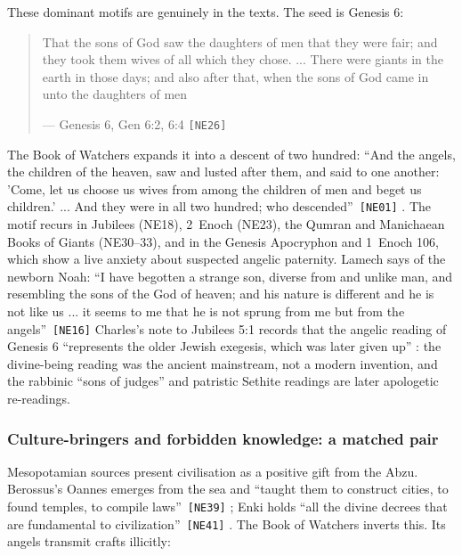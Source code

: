 \documentclass[11pt,a4paper]{article}
\newcommand{\pid}[1]{\texttt{\small #1}}
\begin{document}
These dominant motifs are genuinely in the texts. The seed is Genesis 6:

\begin{quote}\small That the sons of God saw the daughters of men that they were fair; and they took them wives of all which they chose. ... There were giants in the earth in those days; and also after that, when the sons of God came in unto the daughters of men\par\hfill{\footnotesize --- Genesis 6, Gen 6:2, 6:4 \pid{[NE26]}}\end{quote}

The Book of Watchers expands it into a descent of two hundred: \enquote{And the angels, the children of the heaven, saw and lusted after them, and said to one another: 'Come, let us choose us wives from among the children of men and beget us children.' ... And they were in all two hundred; who descended}~\pid{[NE01]} \parencite{charles1917enoch}. The motif recurs in Jubilees (NE18), 2~Enoch (NE23), the Qumran and Manichaean Books of Giants (NE30--33), and in the Genesis Apocryphon and 1~Enoch 106, which show a live anxiety about suspected angelic paternity. Lamech says of the newborn Noah: \enquote{I have begotten a strange son, diverse from and unlike man, and resembling the sons of the God of heaven; and his nature is different and he is not like us ... it seems to me that he is not sprung from me but from the angels}~\pid{[NE16]} Charles's note to Jubilees 5:1 records that the angelic reading of Genesis 6 ``represents the older Jewish exegesis, which was later given up'' \parencite{charles1917jubilees}: the divine-being reading was the ancient mainstream, not a modern invention, and the rabbinic ``sons of judges'' and patristic Sethite readings are later apologetic re-readings.

\subsubsection{Culture-bringers and forbidden knowledge: a matched pair}

Mesopotamian sources present civilisation as a positive gift from the Abzu. Berossus's Oannes emerges from the sea and \enquote{taught them to construct cities, to found temples, to compile laws}~\pid{[NE39]} \parencite{cory1832fragments}; Enki holds \enquote{all the divine decrees that are fundamental to civilization}~\pid{[NE41]} \parencite{kramer1944sumerian}. The Book of Watchers inverts this. Its angels transmit crafts illicitly:
\end{document}
